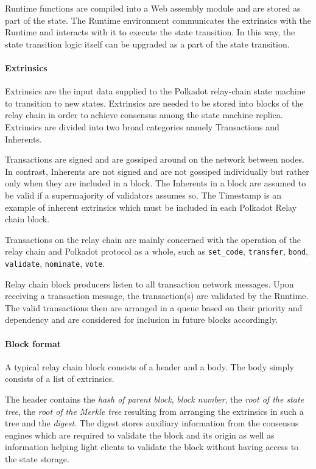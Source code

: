 Runtime functions are compiled into a Web assembly module and are stored as part of the state. The Runtime environment communicates the extrinsics with the Runtime and interacts with it to execute the state transition. In this way, the state transition logic itself can be upgraded as a part of the state transition.

\paragraph{Extrinsics}

Extrinsics are the input data supplied to the Polkadot relay-chain state machine to transition to new states. Extrinsics are needed to be stored into blocks of the relay chain in order to achieve consensus among the state machine replica. Extrinsics are divided into two broad categories namely Transactions and Inherents.

Transactions are signed and are gossiped around on the network between nodes. In contrast, Inherents are not signed and are not gossiped individually but rather only when they are included in a block. The Inherents in a block are assumed to be valid if a supermajority of validators assumes so. The Timestamp is an example of inherent extrinsics which must be included in each Polkadot Relay chain block.

Transactions on the relay chain are mainly concerned with the operation of the relay chain and Polkadot protocol as a whole, such as \texttt{set\_code}, \texttt{transfer}, \texttt{bond}, \texttt{validate}, \texttt{nominate}, \texttt{vote}.

Relay chain block producers listen to all transaction network messages. Upon receiving a transaction message, the transaction(s) are validated by the Runtime. The valid transactions then are arranged in a queue based on their priority and dependency and are considered for inclusion in future blocks accordingly.

\paragraph{Block format}
A typical relay chain block consists of a header and a body. The body simply consists of a list of extrinsics.

The header contains the \textit{hash of parent block}, \textit{block number}, the \textit{root of the state tree}, the \textit{root of the Merkle tree} resulting from arranging the extrinsics in such a tree and the \textit{digest}. The digest stores auxiliary information from the consensus engines which are required to validate the block and its origin as well as information helping light clients to validate the block without having access to the state storage.

